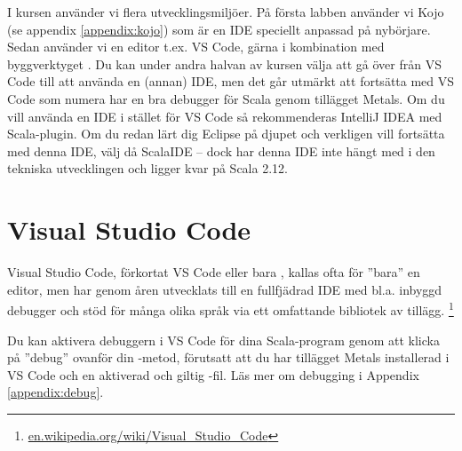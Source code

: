I kursen använder vi flera utvecklingsmiljöer. På första labben använder vi Kojo (se appendix \ref{appendix:kojo}) som är en IDE speciellt anpassad på nybörjare. Sedan använder vi en editor t.ex. VS Code, gärna i kombination med byggverktyget . Du kan under andra halvan av kursen välja att gå över från VS Code till att använda en (annan) IDE, men det går utmärkt att fortsätta med VS Code som numera har en bra debugger för Scala genom tillägget Metals. Om du vill använda en IDE i stället för VS Code så rekommenderas IntelliJ IDEA med Scala-plugin. 
Om du redan lärt dig Eclipse på djupet och verkligen vill fortsätta med denna IDE, välj då ScalaIDE -- dock har denna IDE inte hängt med i den tekniska utvecklingen och ligger kvar på Scala 2.12. 

\section{Visual Studio Code}\label{appendix:ide:vscode}

Visual Studio Code, förkortat VS Code eller bara , kallas ofta för ''bara'' en editor, men har genom åren utvecklats till en fullfjädrad IDE med bl.a. inbyggd debugger och stöd för många olika språk via ett omfattande bibliotek av tillägg.%
\footnote{\href{https://en.wikipedia.org/wiki/Visual\_Studio\_Code}{en.wikipedia.org/wiki/Visual\_Studio\_Code}}

Du kan aktivera debuggern i VS Code för dina Scala-program genom att klicka på ''debug'' ovanför din -metod, förutsatt att du har tillägget Metals installerad i VS Code och en aktiverad och giltig -fil. Läs mer om debugging i Appendix \ref{appendix:debug}.  





% 
